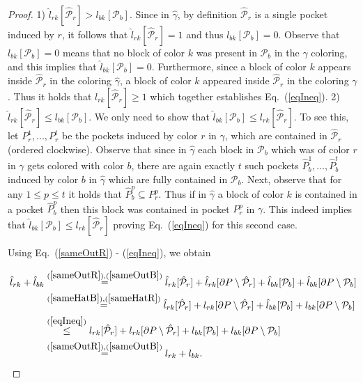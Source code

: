 \documentclass{llncs}
\begin{document}
\begin{proof}
1) $\hat l_{rk}[\hat{ \mathcal{P}}_r] > l_{bk}[\mathcal{P}_b]$. Since in $\hat \gamma$, by definition $\hat{ \mathcal{P}}_r$ is a single pocket induced by $r$, it follows that $\hat l_{rk}[\hat{ \mathcal{P}}_r] = 1$ and thus  $l_{bk}[\mathcal{P}_b] = 0$. Observe that $l_{bk}[\mathcal{P}_b] = 0$ means that no block of color $k$ was present in $\mathcal{P}_b$ in the $\gamma$ coloring, and this implies that $\hat l_{bk}[\mathcal{P}_b] = 0$. Furthermore, since a block of color $k$ appears inside $\hat{ \mathcal{P}}_r$ in the coloring $\hat \gamma$, a block of color $k$ appeared inside $\hat{ \mathcal{P}}_r$ in the coloring $\gamma$. Thus it holds that $ l_{rk}[\hat{ \mathcal{P}}_r] \geq 1$  which together establishes Eq.~(\ref{eqIneq}). 2) $\hat l_{rk}[\hat{ \mathcal{P}}_r] \leq l_{bk}[\mathcal{P}_b]$. We only need to show that  $\hat{l}_{bk}[\mathcal{P}_b] \leq  l_{rk}[\hat{  \mathcal{P}}_r]$. To see this, let $P^1_r, \ldots, P^t_r$ be the pockets induced by color $r$ in $\gamma$, which are contained in $\hat{ \mathcal{P}}_r$ (ordered clockwise).  Observe that since in $\hat \gamma$ each block in $\mathcal{P}_b$ which was of color $r$ in $\gamma$ gets colored with color $b$, there are again exactly $t$ such pockets $\hat  P^1_b, \ldots, \hat  P^t_b$  induced by color $b$ in $\hat \gamma$ which are fully contained in $\mathcal{P}_b$. Next, observe that for any $1 \leq p \leq t$ it holds that $\hat  P^p_b \subseteq P^p_r$. Thus if in $\hat \gamma$ a block of color $k$ is contained in a pocket $\hat P^p_b$ then this block was contained in pocket $P^p_r$ in $\gamma$. This indeed implies that $\hat{l}_{bk}[\mathcal{P}_b] \leq  l_{rk}[\hat{  \mathcal{P}}_r]$ proving Eq.~(\ref{eqIneq}) for this second case.


Using Eq.~(\ref{sameOutR}) - (\ref{eqIneq}), we obtain

\begin{align*}
\hat l_{rk} + \hat l_{bk}  
&\stackrel{ (\ref{sameOutR}),  (\ref{sameOutB})  }= \hat l_{rk}[\hat{ \mathcal{P}}_r] + \hat  l_{rk}[\partial P \setminus \hat{ \mathcal{P}}_r] + \hat l_{bk}[{ \mathcal{P}}_b] + \hat  l_{bk}[\partial P \setminus { \mathcal{P}}_b] \\
&\stackrel{ (\ref{sameHatB}),  (\ref{sameHatR})  }=  \hat l_{rk}[\hat{ \mathcal{P}}_r] +   l_{rk}[\partial P \setminus \hat{ \mathcal{P}}_r] + 
\hat l_{bk}[{ \mathcal{P}}_b] +  l_{bk}[\partial P \setminus { \mathcal{P}}_b] \\
&\stackrel{ (\ref{eqIneq}) }\leq  l_{rk}[\hat{ \mathcal{P}}_r] +   l_{rk}[\partial P \setminus \hat{ \mathcal{P}}_r] + 
l_{bk}[{ \mathcal{P}}_b] +  l_{bk}[\partial P \setminus { \mathcal{P}}_b] \\
&\stackrel{ (\ref{sameOutR}),  (\ref{sameOutB}) } = l_{rk} +  l_{bk}.
\end{align*}



\end{proof}
\end{document}
